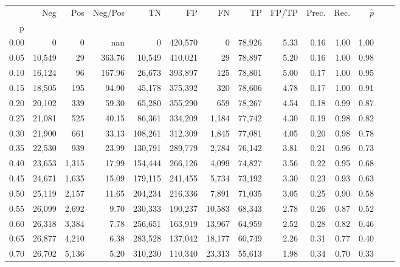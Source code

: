 \begin{tabular}{rrrrrrrrrrrrrr}
\toprule
{} &     Neg &     Pos & Neg/Pos &       TN &       FP &      FN &      TP & FP/TP & Prec. &  Rec. & $\hat{p}$ \\
p    &         &         &         &          &          &         &         &       &       &       &           \\
\midrule
0.00 &       0 &       0 &     nan &        0 &  420,570 &       0 &  78,926 &  5.33 &  0.16 &  1.00 &      1.00 \\
0.05 &  10,549 &      29 &  363.76 &   10,549 &  410,021 &      29 &  78,897 &  5.20 &  0.16 &  1.00 &      0.98 \\
0.10 &  16,124 &      96 &  167.96 &   26,673 &  393,897 &     125 &  78,801 &  5.00 &  0.17 &  1.00 &      0.95 \\
0.15 &  18,505 &     195 &   94.90 &   45,178 &  375,392 &     320 &  78,606 &  4.78 &  0.17 &  1.00 &      0.91 \\
0.20 &  20,102 &     339 &   59.30 &   65,280 &  355,290 &     659 &  78,267 &  4.54 &  0.18 &  0.99 &      0.87 \\
0.25 &  21,081 &     525 &   40.15 &   86,361 &  334,209 &   1,184 &  77,742 &  4.30 &  0.19 &  0.98 &      0.82 \\
0.30 &  21,900 &     661 &   33.13 &  108,261 &  312,309 &   1,845 &  77,081 &  4.05 &  0.20 &  0.98 &      0.78 \\
0.35 &  22,530 &     939 &   23.99 &  130,791 &  289,779 &   2,784 &  76,142 &  3.81 &  0.21 &  0.96 &      0.73 \\
0.40 &  23,653 &   1,315 &   17.99 &  154,444 &  266,126 &   4,099 &  74,827 &  3.56 &  0.22 &  0.95 &      0.68 \\
0.45 &  24,671 &   1,635 &   15.09 &  179,115 &  241,455 &   5,734 &  73,192 &  3.30 &  0.23 &  0.93 &      0.63 \\
0.50 &  25,119 &   2,157 &   11.65 &  204,234 &  216,336 &   7,891 &  71,035 &  3.05 &  0.25 &  0.90 &      0.58 \\
0.55 &  26,099 &   2,692 &    9.70 &  230,333 &  190,237 &  10,583 &  68,343 &  2.78 &  0.26 &  0.87 &      0.52 \\
0.60 &  26,318 &   3,384 &    7.78 &  256,651 &  163,919 &  13,967 &  64,959 &  2.52 &  0.28 &  0.82 &      0.46 \\
0.65 &  26,877 &   4,210 &    6.38 &  283,528 &  137,042 &  18,177 &  60,749 &  2.26 &  0.31 &  0.77 &      0.40 \\
0.70 &  26,702 &   5,136 &    5.20 &  310,230 &  110,340 &  23,313 &  55,613 &  1.98 &  0.34 &  0.70 &      0.33 \\

\end{tabular}
